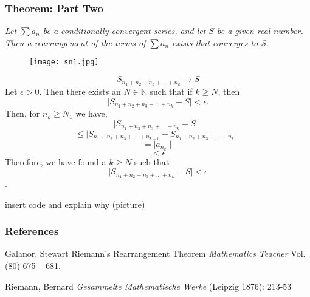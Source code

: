 \documentclass{beamer}
\begin{document}

\begin{frame}
\frametitle{Theorem: Part Two}
\textit{Let $\sum{a_n}$ be a conditionally convergent series, and let $S$ be a given real number. Then a rearrangement of the terms of $\sum{a_n}$ exists that converges to S.}
\end{frame}


\begin{frame}
\begin{figure}  
\centering
\texttt{[image: sn1.jpg]}
\end{figure}
\end{frame}
\begin{frame}
$$S_{{n_1}+{n_2}+{n_3}+...+{n_k}} \rightarrow S$$
Let $\epsilon >0$. Then there exists an $N \in \mathbb{N}$ such that if $k \geq N$, then
$$\mid S_{{n_1}+{n_2}+{n_3}+...+{n_k}} - S\mid < \epsilon.$$
 Then, for $n_k\geq N_1$ we have,
$$\mid S_{{n_1}+{n_2}+{n_3}+...+{n_k}} - S\mid $$
$$\leq  \mid S_{{n_1}+{n_2}+{n_3}+...+{n_{k-1}}} - S_{{n_1}+{n_2}+{n_3}+...+{n_k}} \mid$$
$$= \mid a_{n_k}\mid$$
$$<\epsilon$$ 
Therefore, we have found a $k\geq N$ such that $$\mid S_{{n_1}+{n_2}+{n_3}+...+{n_k}} - S\mid < \epsilon$$. 
\end{frame}

\begin{frame}
insert code and explain why (picture)
\end{frame}


\begin{frame}
\frametitle{References}
\footnotesize{
\begin{thebibliography}{99} %
 Galanor, Stewart
\newblock Riemann's Rearrangement Theorem
\newblock \emph{Mathematics Teacher} Vol.(80) 675 -- 681.

 Riemann, Bernard
\newblock \emph{Gesammelte Mathematische Werke} (Leipzig 1876): 213-53
\end{thebibliography}
}
\end{frame}

\end{document}
